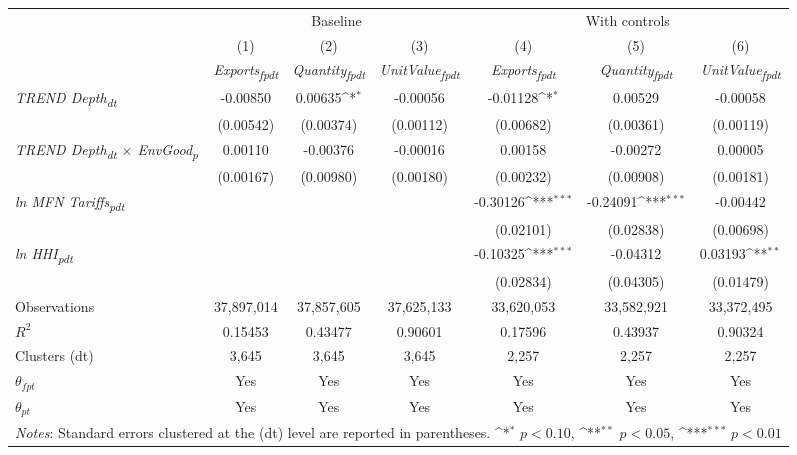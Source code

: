 {
\def\sym#1{\ifmmode^{#1}\else\(^{#1}\)\fi}
\begin{tabular}{l*{6}{c}}
\toprule
&\multicolumn{3}{c}{Baseline}&\multicolumn{3}{c}{With controls}\\\cmidrule(lr){2-4}\cmidrule(lr){5-7}
&(1)&(2)&(3)&(4)&(5)&(6)\\
&\textit{Exports\textsubscript{fpdt}}&\textit{Quantity\textsubscript{fpdt}}&\textit{UnitValue\textsubscript{fpdt}}&\textit{Exports\textsubscript{fpdt}}&\textit{Quantity\textsubscript{fpdt}}&\textit{UnitValue\textsubscript{fpdt}}\\
\midrule
\textit{TREND Depth\textsubscript{dt}} & -0.00850 & 0.00635\sym{*} & -0.00056 & -0.01128\sym{*} & 0.00529 & -0.00058\\
 & (0.00542) & (0.00374) & (0.00112) & (0.00682) & (0.00361) & (0.00119)\\
\addlinespace
\textit{TREND Depth\textsubscript{dt} $\times$ EnvGood\textsubscript{p}} & 0.00110 & -0.00376 & -0.00016 & 0.00158 & -0.00272 & 0.00005\\
 & (0.00167) & (0.00980) & (0.00180) & (0.00232) & (0.00908) & (0.00181)\\
\addlinespace
\textit{ln MFN Tariffs\textsubscript{pdt}} &  &  &  & -0.30126\sym{***} & -0.24091\sym{***} & -0.00442\\
 &  &  &  & (0.02101) & (0.02838) & (0.00698)\\
\addlinespace
\textit{ln HHI\textsubscript{pdt}} &  &  &  & -0.10325\sym{***} & -0.04312 & 0.03193\sym{**}\\
 &  &  &  & (0.02834) & (0.04305) & (0.01479)\\
\midrule
Observations & 37,897,014 & 37,857,605 & 37,625,133 & 33,620,053 & 33,582,921 & 33,372,495\\
$R^{2}$ & 0.15453 & 0.43477 & 0.90601 & 0.17596 & 0.43937 & 0.90324\\
Clusters (dt) & 3,645 & 3,645 & 3,645 & 2,257 & 2,257 & 2,257\\
$\theta_{fpt}$ & Yes & Yes & Yes & Yes & Yes & Yes\\
$\theta_{pt}$ & Yes & Yes & Yes & Yes & Yes & Yes\\
\bottomrule
\multicolumn{7}{l}{\footnotesize \textit{Notes}: Standard errors clustered at the (dt) level are reported in parentheses. \sym{*} \(p<0.10\), \sym{**} \(p<0.05\), \sym{***} \(p<0.01\)}\\
\end{tabular}
}
